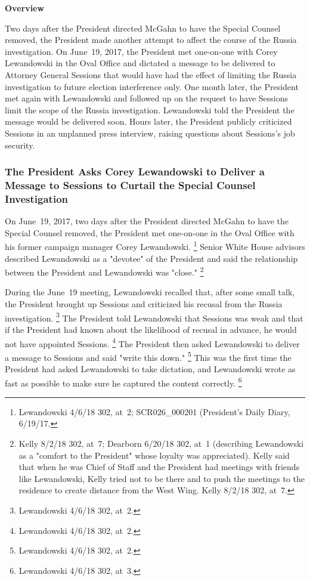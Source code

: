 \begin{center}
\textbf{Overview}
\end{center}

Two days after the President directed McGahn to have the Special Counsel removed, the President made another attempt to affect the course of the Russia investigation.
On June~19, 2017, the President met one-on-one with Corey Lewandowski in the Oval Office and dictated a message to be delivered to Attorney General Sessions that would have had the effect of limiting the Russia investigation to future election interference only.
One month later, the President met again with Lewandowski and followed up on the request to have Sessions limit the scope of the Russia investigation.
Lewandowski told the President the message would be delivered soon.
Hours later, the President publicly criticized Sessions in an unplanned press interview, raising questions about Sessions's job security.

\subsubsection{The President Asks Corey Lewandowski to Deliver a Message to Sessions to Curtail the Special Counsel Investigation}

On June~19, 2017, two days after the President directed McGahn to have the Special Counsel removed, the President met one-on-one in the Oval Office with his former campaign manager Corey Lewandowski.%
\footnote{Lewandowski 4/6/18 302, at~2;
SCR026\_000201 (President's Daily Diary, 6/19/17.
}
Senior White House advisors described Lewandowski as a "devotee" of the President and said the relationship between the President and Lewandowski was "close."%
\footnote{Kelly 8/2/18 302, at~7;
Dearborn 6/20/18 302, at~1 (describing Lewandowski as a "comfort to the President" whose loyalty was appreciated).
Kelly said that when he was Chief of Staff and the President had meetings with friends like Lewandowski, Kelly tried not to be there and to push the meetings to the residence to create distance from the West Wing.
Kelly 8/2/18 302, at~7.}

During the June~19 meeting, Lewandowski recalled that, after some small talk, the President brought up Sessions and criticized his recusal from the Russia investigation.%
\footnote{Lewandowski 4/6/18 302, at~2.}
The President told Lewandowski that Sessions was weak and that if the President had known about the likelihood of recusal in advance, he would not have appointed Sessions.%
\footnote{Lewandowski 4/6/18 302, at~2.}
The President then asked Lewandowski to deliver a message to Sessions and said "write this down."%
\footnote{Lewandowski 4/6/18 302, at~2.}
This was the first time the President had asked Lewandowski to take dictation, and Lewandowski wrote as fast as possible to make sure he captured the content correctly.%
\footnote{Lewandowski 4/6/18 302, at~3.}

